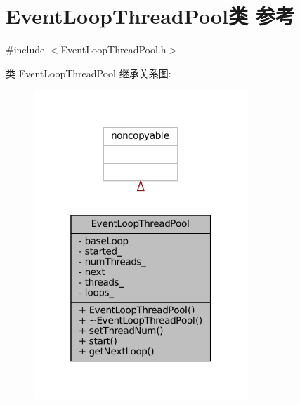 \hypertarget{classmuduo_1_1EventLoopThreadPool}{}\section{Event\+Loop\+Thread\+Pool类 参考}
\label{classmuduo_1_1EventLoopThreadPool}


{\ttfamily \#include $<$Event\+Loop\+Thread\+Pool.\+h$>$}



类 Event\+Loop\+Thread\+Pool 继承关系图\+:
\nopagebreak
\begin{figure}[H]
\begin{center}
\leavevmode
\includegraphics[width=229pt]{classmuduo_1_1EventLoopThreadPool__inherit__graph}
\end{center}
\end{figure}


